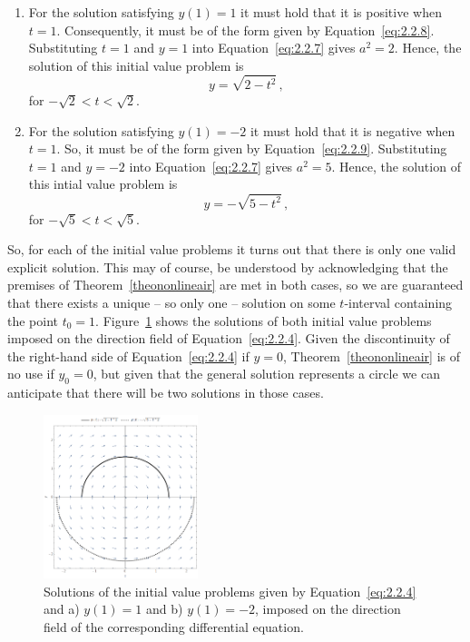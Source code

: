 \begin{example}
\begin{enumerate}
\item For the solution satisfying $y(1)=1 $ it must hold that it is positive when $t=1$. Consequently, it must be of the form given by Equation~\eqref{eq:2.2.8}.  Substituting $t=1$ and $y=1$ into Equation~\eqref{eq:2.2.7} gives $a^2=2$. Hence, the solution of this initial value problem is
$$
y=\sqrt{2-t^2}\,,
$$
for $- \sqrt{2}< t < \sqrt{2}$.
\item  For the solution satisfying $y(1)=-2 $ it must hold that it is negative when $t=1$. So, it must be of the form given by Equation~\eqref{eq:2.2.9}.  Substituting $t=1$ and $y=-2$ into Equation~\eqref{eq:2.2.7} gives $a^2=5$. Hence, the solution of this intial value problem is
$$
y=- \sqrt{5-t^2}\,,
$$
for $-\sqrt{5} < t < \sqrt{5}$.
\end{enumerate}
So, for each of the initial value problems it turns out that there is only one valid explicit solution. This may of course, be understood by acknowledging that the premises of Theorem~\ref{theononlineair} are met in both cases, so we are guaranteed that there exists a unique -- so only one -- solution on some $t$-interval containing the point $t_0=1$.  Figure~\ref{etsepcircles} shows the solutions of both initial value problems imposed on the direction field of Equation~\eqref{eq:2.2.4}. Given the discontinuity of the right-hand side of Equation~\eqref{eq:2.2.4} if $y=0$, Theorem~\ref{theononlineair} is of no use if $y_0=0$, but given that the general solution represents a circle we can anticipate that there will be two solutions in those cases. 

\begin{figure}[H]
	\begin{center}
			\includegraphics[width=0.4\textwidth]{exsepcircles}
	\caption{Solutions of the initial value problems given by Equation~\eqref{eq:2.2.4} and a) $y(1)=1$ and b) $y(1)=-2$, imposed on the direction field of the corresponding differential equation.}
	\label{etsepcircles}
	\end{center}
\end{figure}



\end{example}

